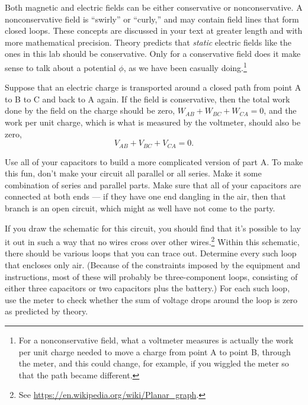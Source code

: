 
Both magnetic and electric fields can be either conservative or nonconservative.
A nonconservative field is ``swirly'' or ``curly,'' and may contain field lines
that form closed loops. These concepts are discussed in your text at greater length and
with more mathematical precision. Theory predicts that \emph{static} electric fields
like the ones in this lab should be conservative. Only for a conservative field does
it make sense to talk about a potential $\phi$, as we have been casually 
doing.\footnote{For a nonconservative field, what a voltmeter measures is actually the work
per unit charge needed to move a charge from point A to point B, through the meter, and this could
change, for example, if you wiggled the meter so that the path became different.}

Suppose that an electric charge is transported around a closed path from point A to B to C
and back to A again. If the field is conservative, then the total work done by the field
on the charge should be zero, $  W_{AB}+W_{BC}+W_{CA}=0$, and the work per unit charge,
which is what is measured by the voltmeter, should also be zero,
\begin{equation*}
  V_{AB}+V_{BC}+V_{CA}=0.
\end{equation*}

Use all of your capacitors to build a more complicated version of part A.
To make this fun, don't make your circuit all parallel or all series. Make it some
combination of series and parallel parts. Make sure that all of your capacitors are
connected at both ends --- if they have one end dangling in the air, then that branch
is an open circuit, which might as well have not come to the party.

If you draw the schematic for this circuit, you should find that it's possible to lay it
out in such a way that no wires cross over other wires.\footnote{See \url{https://en.wikipedia.org/wiki/Planar_graph}.}
Within this schematic, there should be various loops that you can trace out.
Determine every such loop that encloses only air. (Because of the constraints
imposed by the equipment and instructions, most of these will probably be
three-component loops, consisting of either three capacitors or two capacitors plus
the battery.) For each such loop, use the meter to check whether the sum of voltage
drops around the loop is zero as predicted by theory.



\analysis

